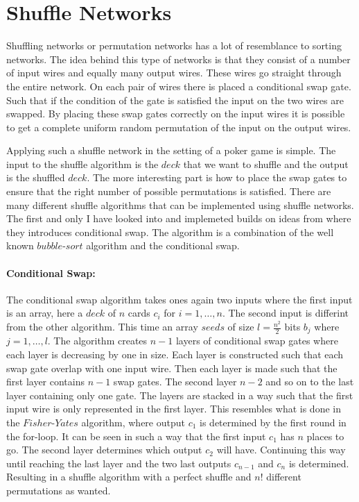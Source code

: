 

\section{Shuffle Networks}
Shuffling networks or permutation networks has a lot of resemblance to sorting networks. The idea behind this type of networks is that they consist of a number of input wires and equally many output wires. These wires go straight through the entire network. On each pair of wires there is placed a conditional swap gate. Such that if the condition of the gate is satisfied the input on the two wires are swapped. By placing these swap gates correctly on the input wires it is possible to get a complete uniform random permutation of the input on the output wires.

Applying such a shuffle network in the setting of a poker game is simple. The input to the shuffle algorithm is the $deck$ that we want to shuffle and the output is the shuffled $deck$. The more interesting part is how to place the swap gates to ensure that the right number of possible permutations is satisfied. There are many different shuffle algorithms that can be implemented using shuffle networks. The first and only I have looked into and implemeted builds on ideas from  where they introduces conditional swap. The algorithm is a combination of the well known $bubble\text{-}sort$ algorithm and the conditional swap.

\bigskip

\paragraph{Conditional Swap:}


The conditional swap algorithm takes ones again two inputs where the first input is an array, here a $deck$ of $n$ cards $c_i$ for $i=1,\dots,n$. The second input is differint from the other algorithm. This time an array $seeds$ of size $l=\frac{n^2}{2}$ bits $b_j$ where $j=1,\dots, l$. The algorithm creates $n-1$ layers of conditional swap gates where each layer is decreasing by one in size. Each layer is constructed such that each swap gate overlap with one input wire. Then each layer is made such that the first layer contains $n-1$ swap gates. The second layer $n-2$ and so on to the last layer containing only one gate. The layers are stacked in a way such that the first input wire is only represented in the first layer. This resembles what is done in the $Fisher\text{-}Yates$ algorithm, where output $c_1$ is determined by the first round in the for-loop. It can be seen in such a way that the first input $c_1$ has $n$ places to go. The second layer determines which output $c_2$ will have. Continuing this way until reaching the last layer and the two last outputs $c_{n-1}$ and $c_n$ is determined. Resulting in a shuffle algorithm with a perfect shuffle and $n!$ different permutations as wanted.

